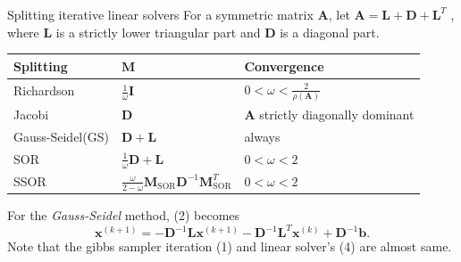 \documentclass[10pt]{beamer}
\begin{document}
\begin{frame}{Splitting iterative linear solvers}
For a symmetric matrix $\mathbf{A}$, let $\mathbf{A} = \mathbf{L} + \mathbf{D} + \mathbf{L}^T$
, where $\mathbf{L}$ is a strictly lower triangular part and $\mathbf{D}$ is a diagonal part.
\begin{table}[]
    \begin{tabular}{@{}lll@{}}
    \toprule
     Splitting &  $\mathbf{M}$ &  Convergence\\ \midrule
     Richardson & $\frac{1}{\omega}\mathbf{I}$  & $0 < \omega < \frac{2}{\rho(\mathbf{A})}$ \\
     Jacobi &  $\mathbf{D}$ & $\mathbf{A}$ strictly diagonally dominant \\
     Gauss-Seidel(GS) & $\mathbf{D} + \mathbf{L}$ & always \\
     SOR & $\frac{1}{\omega}\mathbf{D} + \mathbf{L}$ & $0 < \omega < 2$ \\
     SSOR & $\frac{\omega}{2 - \omega}\mathbf{M}_{\text{SOR}}\mathbf{D}^{-1}\mathbf{M}_{\text{SOR}}^T$ 
     & $0 < \omega < 2$ \\ \bottomrule
    \end{tabular}
\end{table}
For the \emph{\color{blue}Gauss-Seidel} method, (2) becomes
    \begin{equation}
        \mathbf{x}^{(k+1)} = -\mathbf{D}^{-1}\mathbf{L}\mathbf{x}^{(k+1)} - \mathbf{D}^{-1}\mathbf{L}^T\mathbf{x}^{(k)} + \mathbf{D}^{-1}\mathbf{b}.
    \end{equation}
Note that the gibbs sampler iteration (1) and linear solver's (4) are almost same. 
\end{frame}
\end{document}
